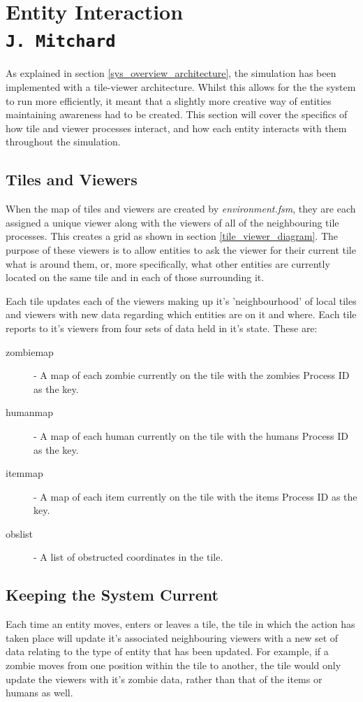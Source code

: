 \pagestyle{empty}
\section{Entity Interaction\\{\small\tt J.~Mitchard}}
\label{entity_interactions}
As explained in section \ref{sys_overview_architecture}, the simulation has been implemented with a tile-viewer architecture. Whilst this allows for the the system to run more efficiently, it meant that a slightly more creative way of entities maintaining awareness had to be created. This section will cover the specifics of how tile and viewer processes interact, and how each entity interacts with them throughout the simulation.

\subsection{Tiles and Viewers}
\label{tiles_and_viewers}
When the map of tiles and viewers are created by \emph{environment.fsm}, they are each assigned a unique viewer along with the viewers of all of the neighbouring tile processes. This creates a grid as shown in section \ref{tile_viewer_diagram}. The purpose of these viewers is to allow entities to ask the viewer for their current tile what is around them, or, more specifically, what other entities are currently located on the same tile and in each of those surrounding it.

Each tile updates each of the viewers making up it's 'neighbourhood' of local tiles and viewers with new data regarding which entities are on it and where. Each tile reports to it's viewers from four sets of data held in it's state. These are:
\begin{description}
  \item[zombie\textunderscore map] - A map of each zombie currently on the tile with the zombies Process ID as the key.
  \item[human\textunderscore map] - A map of each human currently on the tile with the humans Process ID as the key.
  \item[item\textunderscore map] - A map of each item currently on the tile with the items Process ID as the key.
  \item[obs\textunderscore list] - A list of obstructed coordinates in the tile.
\end{description}

\subsection{Keeping the System Current}
Each time an entity moves, enters or leaves a tile, the tile in which the action has taken place will update it's associated neighbouring viewers with a new set of data relating to the type of entity that has been updated. For example, if a zombie moves from one position within the tile to another, the tile would only update the viewers with it's zombie data, rather than that of the items or humans as well.

